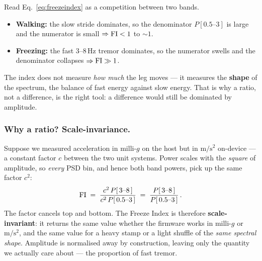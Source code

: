 \begin{mathsbox}
Read Eq.~\eqref{eq:freezeindex} as a competition between two bands.
\begin{itemize}
\item \textbf{Walking:} the slow stride dominates, so the denominator
$P[0.5\text{--}3]$ is large and the numerator is small $\Rightarrow \mathrm{FI} < 1$ to
$\sim\!1$.
\item \textbf{Freezing:} the fast 3--8\,Hz tremor dominates, so the numerator swells
and the denominator collapses $\Rightarrow \mathrm{FI} \gg 1$.
\end{itemize}
The index does not measure \emph{how much} the leg moves --- it measures the
\textbf{shape} of the spectrum, the balance of fast energy against slow energy. That
is why a ratio, not a difference, is the right tool: a difference would still be
dominated by amplitude.
\end{mathsbox}

\subsubsection*{Why a ratio? Scale-invariance.}

Suppose we measured acceleration in milli-$g$ on the host but in $\si{\meter\per\square\second}$
on-device --- a constant factor $c$ between the two unit systems. Power scales with the
\emph{square} of amplitude, so \emph{every} PSD bin, and hence both band powers, pick
up the same factor $c^2$:
%
\begin{equation}
\mathrm{FI} \;=\; \frac{c^2\,P[\,\SI{3}{}\text{--}\SI{8}{}\,]}
                {c^2\,P[\,\SI{0.5}{}\text{--}\SI{3}{}\,]}
       \;=\; \frac{P[\,\SI{3}{}\text{--}\SI{8}{}\,]}{P[\,\SI{0.5}{}\text{--}\SI{3}{}\,]}\,.
\label{eq:scaleinv}
\end{equation}
%
The factor cancels top and bottom. The Freeze Index is therefore
\textbf{scale-invariant}: it returns the same value whether the firmware works in
milli-$g$ or $\si{\meter\per\square\second}$, and the same value for a heavy stamp or a
light shuffle of the \emph{same spectral shape}. Amplitude is normalised away by
construction, leaving only the quantity we actually care about --- the proportion of
fast tremor.

